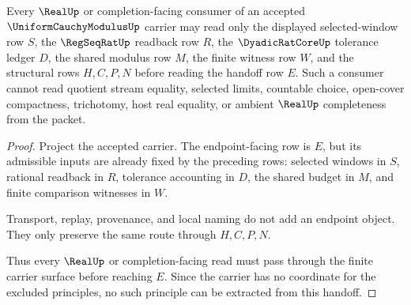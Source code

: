 \begin{theorem}\label{thm:uniform-cauchy-modulus-real-handoff}
Every $\RealUp$ or completion-facing consumer of an accepted $\UniformCauchyModulusUp$ carrier may read only the displayed selected-window row $S$, the $\RegSeqRatUp$ readback row $R$, the $\DyadicRatCoreUp$ tolerance ledger $D$, the shared modulus row $M$, the finite witness row $W$, and the structural rows $H,C,P,N$ before reading the handoff row $E$. Such a consumer cannot read quotient stream equality, selected limits, countable choice, open-cover compactness, trichotomy, host real equality, or ambient $\RealUp$ completeness from the packet.
\end{theorem}
\begin{proof}
Project the accepted carrier. The endpoint-facing row is $E$, but its admissible inputs are already fixed by the preceding rows: selected windows in $S$, rational readback in $R$, tolerance accounting in $D$, the shared budget in $M$, and finite comparison witnesses in $W$.

Transport, replay, provenance, and local naming do not add an endpoint object. They only preserve the same route through $H,C,P,N$.

Thus every $\RealUp$ or completion-facing read must pass through the finite carrier surface before reaching $E$. Since the carrier has no coordinate for the excluded principles, no such principle can be extracted from this handoff.
\end{proof}

